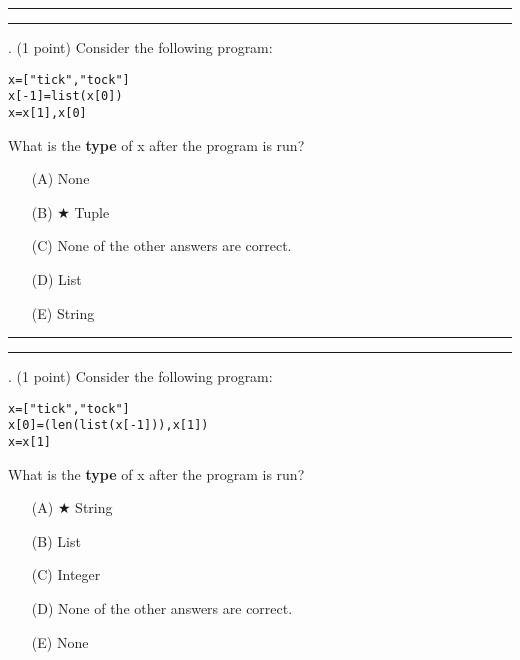 \documentclass{article}
\begin{document}
\vspace*{2em}
\hrule
\vspace{2em}

\vspace{2em}
\hrule height 2pt


\newpage
{}. (1 point)
Consider the following program:
\begin{verbatim}
x=["tick","tock"]
x[-1]=list(x[0])
x=x[1],x[0]
\end{verbatim}
What is the \textbf{type} of x after the program is run?


\begin{enumerate}
\item[(A)]
None

\item[(B)] $\bigstar$ 
Tuple

\item[(C)]
None of the other answers are correct.

\item[(D)]
List

\item[(E)]
String

\end{enumerate}

\vspace*{2em}
\hrule
\vspace{2em}

\vspace{2em}
\hrule height 2pt


\newpage
{}. (1 point)
Consider the following program:
\begin{verbatim}
x=["tick","tock"]
x[0]=(len(list(x[-1])),x[1])
x=x[1]
\end{verbatim}
What is the \textbf{type} of x after the program is run?


\begin{enumerate}
\item[(A)] $\bigstar$ 
String

\item[(B)]
List

\item[(C)]
Integer

\item[(D)]
None of the other answers are correct.

\item[(E)]
None

\end{enumerate}
\end{document}

